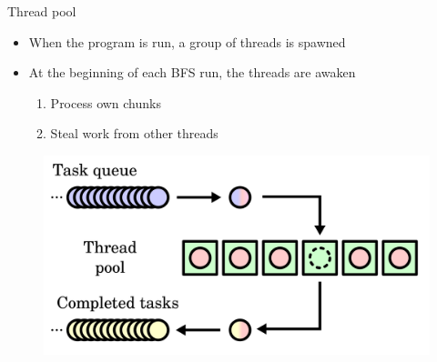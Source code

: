 \begin{frame}{Thread pool}
\begin{itemize}
  \item When the program is run, a group of threads is spawned
  \item At the beginning of each BFS run, the threads are awaken
  \begin{enumerate}
    \item Process own chunks
    \item Steal work from other threads
  \end{enumerate}
\end{itemize}
\begin{figure}
  \centering
  \includegraphics[width=0.5\linewidth]{images/Thread_pool.png}
\end{figure}
\end{frame}
